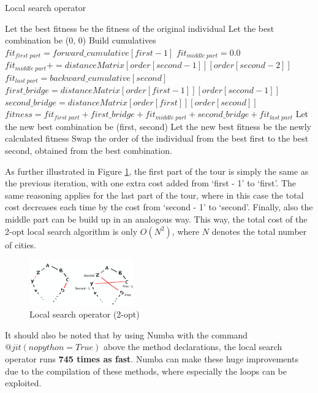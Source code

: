 \documentclass[a4paper,10pt]{article}
\begin{document}
\begin{algorithm}
\caption{Local search operator}\label{local_search_operator_algorithm}
\begin{algorithmic}
\State Let the best fitness be the fitness of the original individual
\State Let the best combination be (0, 0)
\State Build cumulatives
\State $fit_{first \; part} = forward\_cumulative[first - 1]$
\State $fit_{middle \; part} = 0.0$
\State $fit_{middle \; part} \mathrel{{+}{=}} distanceMatrix[order[second-1]][order[second-2]]$
\State $fit_{last \; part} = backward\_cumulative[second]$
\State $first\_bridge = distanceMatrix[order[first-1]][order[second-1]]$
\State $second\_bridge = distanceMatrix[order[first]][order[second]]$
\State $fitness = fit_{first \; part} + first\_bridge + fit_{middle \; part} + second\_bridge + fit_{last \; part}$
\State Let the new best combination be (first, second)
\State Let the new best fitness be the newly calculated fitness
\EndIf
\EndFor
\EndFor
\State Swap the order of the individual from the best first to the best second, obtained from the best combination.
\end{algorithmic}
\end{algorithm}

As further illustrated in Figure \ref{local_search_operator_2_opt}, the first part of the tour is simply the same as the previous iteration, with one extra cost added from `first - 1' to `first'. The same reasoning applies for the last part of the tour, where in this case the total cost decreases each time by the cost from `second - 1' to `second'. Finally, also the middle part can be build up in an analogous way. This way, the total cost of the 2-opt local search algorithm is only $O(N^2)$, where $N$ denotes the total number of cities. 

\begin{figure}[H]
\caption{Local search operator (2-opt) \cite{local_search_slides}}
\label{local_search_operator_2_opt}
\centering
\includegraphics[width=0.4\textwidth]{local_search_operator_2_opt.png}
\end{figure}

It should also be noted that by using Numba with the command $@jit(nopython=True)$ above the method declarations, the local search operator runs \textbf{745 times as fast}. Numba can make these huge improvements due to the compilation of these methods, where especially the loops can be exploited.
\end{document}
